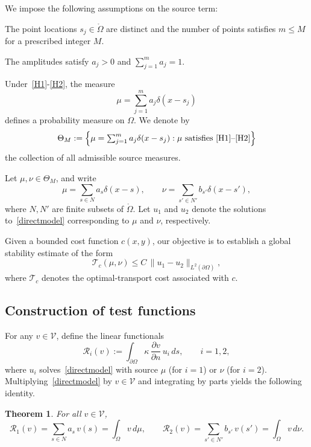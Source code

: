 \documentclass[12pt]{amsart}
\newtheorem{thm}{Theorem}
\begin{document}
We impose the following assumptions on the source term:
\begin{Henum}
\item\label{H1}
The point locations $s_j\in\mathring{\Omega}$ are distinct and the number of points satisfies $m\le M$ for a prescribed integer $M$.
\item\label{H2}
The amplitudes satisfy $a_j>0$ and $\sum_{j=1}^m a_j = 1$.
\end{Henum}

Under~\ref{H1}-\ref{H2}, the measure
\[
\mu = \sum_{j=1}^{m} a_j\delta(x-s_j)
\]
defines a probability measure on $\Omega$. We denote by
\[
\Theta_M := \Bigl\{\mu=\textstyle\sum_{j=1}^{m} a_j \delta(x-s_j): \mu \text{ satisfies \ref{H1}--\ref{H2}}\Bigr\}
\]
the collection of all admissible source measures.

Let $\mu,\nu\in\Theta_M$, and write
\[
\mu=\sum_{s\in N} a_s \delta(x-s),\qquad 
\nu=\sum_{s'\in N'} b_{s'} \delta(x-s'),
\]
where $N,N'$ are finite subsets of $\mathring{\Omega}$. Let $u_1$ and $u_2$ denote the solutions to~\eqref{directmodel} corresponding to $\mu$ and $\nu$, respectively.

Given a bounded cost function $c(x,y)$, our objective is to establish a global stability estimate of the form
\begin{equation}\label{stability}
\mathcal{T}_c(\mu,\nu) \le C\,\|u_1-u_2\|_{L^2(\partial\Omega)},
\end{equation}
where $\mathcal{T}_c$ denotes the optimal-transport cost associated with $c$.



\subsection{Construction of test functions}

For any \(v\in\mathcal{V}\), define the linear functionals
\begin{equation}\label{Definition of Rv}
\mathcal{R}_i(v):=\int_{\partial\Omega}\kappa\,\frac{\partial v}{\partial n}\,u_i\,ds,\qquad i=1,2,
\end{equation}
where $u_i$ solves~\eqref{directmodel} with source $\mu$ (for $i=1$) or $\nu$ (for $i=2$).
Multiplying~\eqref{directmodel} by $v\in\mathcal{V}$ and integrating by parts yields the following identity.

\begin{thm}\label{Rv duality thm}
For all \(v\in\mathcal{V}\),
\[
\mathcal{R}_1(v)=\sum_{s\in N}a_s\,v(s)=\int_\Omega v\,d\mu,\qquad
\mathcal{R}_2(v)=\sum_{s'\in N'}b_{s'}\,v(s')=\int_\Omega v\,d\nu.
\]
\end{thm}
\end{document}
